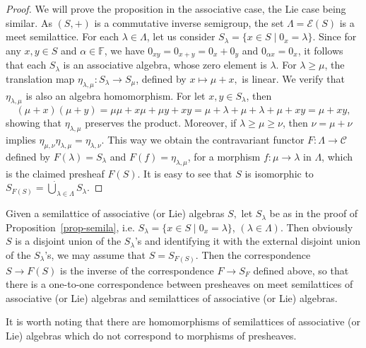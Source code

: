 \documentclass{amsart}
\newcommand{\E}{\mathcal{E}}
\newcommand{\F}{\mathbb{F}}
\newcommand{\0}{{\vartheta}}
\theoremstyle{definition}
\theoremstyle{remark}
\numberwithin{equation}{section}
\newtheorem*{Theorem A}{\textbf{Theorem A}}
\newtheorem*{Corollary E}{\textbf{Corollary E}}
\newtheorem*{Corollary F}{\textbf{Corollary F}}
\newtheorem*{Theorem B}{\textbf{Theorem B}}
\newtheorem*{Theorem C}{\textbf{Theorem C}}
\newtheorem*{Theorem D}{\textbf{Theorem B}}
\newtheorem*{p a}{\textbf{Proof of  Theorem A}}
\newtheorem*{p b}{\textbf{Proof of Theorem B}}
\newtheorem*{p c}{\textbf{Proof of  Theorem C}}
\newtheorem*{p d}{\textbf{Proof of  Theorem D}}
\begin{document}
\begin{proof}
We will prove the proposition in the associative case, the Lie case being similar. 
As $(S,+)$ is a commutative inverse semigroup, the set $\Lambda=\E(S)$ is a meet semilattice.  For each $\lambda\in \Lambda$, let us consider $S_{\lambda}=\{ x\in S\mid 0_x=\lambda\}$. Since for any $x,y\in S$ and $\alpha\in \F$, we have $0_{xy}=0_{x+y}=0_x+0_y$ and $0_{\alpha x}=0_x$, it follows that each $S_\lambda$ is an associative algebra, whose zero element is $\lambda$. For $\lambda\geq \mu$, the translation map $\eta_{\lambda,\mu}:S_{\lambda} \rightarrow S_{\mu}$, defined by $x\mapsto \mu+x,$ is  linear. We verify that $\eta_{\lambda,\mu}$ is also an algebra homomorphism. For let $x,y\in S_\lambda$, then
$$(\mu+x)(\mu+y)=\mu\mu+x\mu+\mu y+xy=
 \mu+\lambda+\mu+\lambda+\mu+xy=\mu+xy,$$  showing that $\eta_{\lambda,\mu}$ preserves the product. Moreover, if  $\lambda\geq \mu \geq \nu$,  then 
$\nu=\mu+\nu$ implies $ \eta_{\mu,\nu} \eta_{\lambda,\mu}= \eta_{\lambda,\nu}$.   This way we obtain  the contravariant functor $F:\Lambda\to \mathcal{C}$ defined by $F(\lambda)=S_\lambda$ and $F(f)=\eta_{\lambda,\mu}$, for a morphism $f:\mu \to \lambda$ in $\Lambda$, which is the claimed  presheaf $F(S).$ It is easy to see that $S$ is isomorphic to   $S_{F(S)}=\dot{\bigcup}_{\lambda\in \Lambda} S_{\lambda}.$ 
\end{proof}

Given  a semilattice of  associative (or Lie) algebras $S,$  let $S_{\lambda}$ be as in the proof of Proposition~\ref{prop-semila}, i.e.   $S_{\lambda}=\{ x\in S\mid 0_x=\lambda\}$, $(\lambda \in \Lambda).$ Then obviously $S$ is a disjoint union of the $S_{\lambda}$'s and identifying it with the external disjoint union of the $S_{\lambda}$'s, we may assume that  $S =S_{F(S)}.$ Then the correspondence $S\to F(S)$ is the inverse of the correspondence $F\to S_F$ defined above, so that there is a one-to-one correspondence between 
presheaves on meet semilattices of associative (or Lie) algebras and   semilattices of associative (or Lie) algebras.

 It is worth noting  that there are homomorphisms 
 of semilattices of associative (or Lie) algebras which do not  correspond to morphisms of presheaves.

\end{document}
